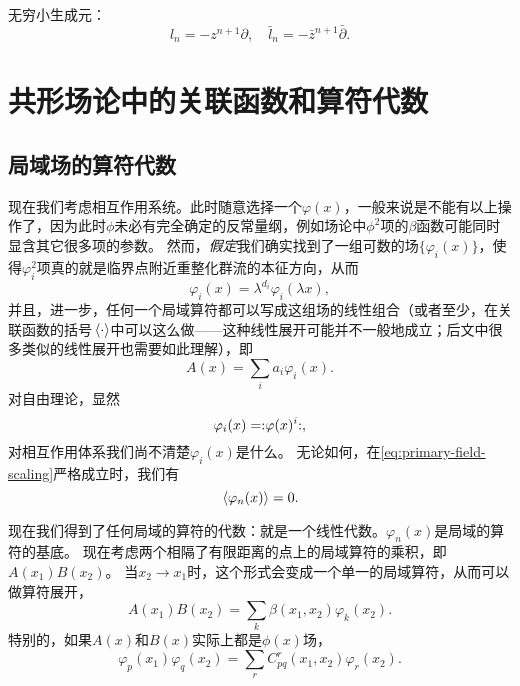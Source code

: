 无穷小生成元：
\begin{equation}
    l_n = - z^{n+1} \partial, \quad \bar{l}_n = - \bar{z}^{n+1} \bar{\partial}.
\end{equation}


\section{共形场论中的关联函数和算符代数}

\subsection{局域场的算符代数}

现在我们考虑相互作用系统。此时随意选择一个$\varphi(x)$，一般来说是不能有以上操作了，因为此时$\phi$未必有完全确定的反常量纲，例如场论中$\phi^2$项的$\beta$函数可能同时显含其它很多项的参数。
然而，\emph{假定}我们确实找到了一组可数的场$\{\varphi_i(x)\}$，使得$\varphi_i^2$项真的就是临界点附近重整化群流的本征方向，从而
\begin{equation}
    \varphi_i(x) = \lambda^{d_i} \varphi_i(\lambda x),
    \label{eq:primary-field-scaling}
\end{equation}
并且，进一步，任何一个局域算符都可以写成这组场的线性组合（或者至少，在关联函数的括号$\expval*{\cdot}$中可以这么做——这种线性展开可能并不一般地成立；后文中很多类似的线性展开也需要如此理解），即
\begin{equation}
    A(x) = \sum_{i} a_i \varphi_i(x).
\end{equation}
对自由理论，显然
\begin{equation}
    \varphi_i(x) = \mathrel{\mathop{:}}\mathrel{\varphi(x)^i}\mathrel{\mathop{:}},
\end{equation}
对相互作用体系我们尚不清楚$\varphi_i(x)$是什么。
无论如何，在\eqref{eq:primary-field-scaling}严格成立时，我们有
\begin{equation}
    \expval*{\varphi_n(x)} = 0.
\end{equation}

现在我们得到了任何局域的算符的代数：就是一个线性代数。$\varphi_n(x)$是局域的算符的基底。
现在考虑两个相隔了有限距离的点上的局域算符的乘积，即$A(x_1) B(x_2)$。
当$x_2 \to x_1$时，这个形式会变成一个单一的局域算符，从而可以做算符展开，
\begin{equation}
    A(x_1) B(x_2) = \sum_{k} \beta(x_1, x_2) \varphi_k(x_2).
\end{equation}
特别的，如果$A(x)$和$B(x)$实际上都是$\phi(x)$场，
\begin{equation}
    \varphi_p(x_1) \varphi_q(x_2) = \sum_{r} C_{pq}^r(x_1, x_2) \varphi_r(x_2). 
\end{equation}

